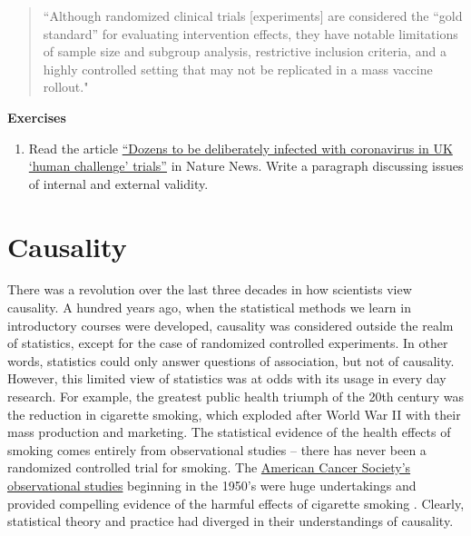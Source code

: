 \documentclass[]{book}
\providecommand{\tightlist}{%
  \setlength{\itemsep}{0pt}\setlength{\parskip}{0pt}}
\begin{document}
\begin{quote}
``Although randomized clinical trials {[}experiments{]} are considered the ``gold standard'' for evaluating intervention effects, they have notable limitations of sample size and subgroup analysis, restrictive inclusion criteria, and a highly controlled setting that may not be replicated in a mass vaccine rollout."
\end{quote}

\textbf{Exercises}

\begin{enumerate}
\def\labelenumi{\arabic{enumi}.}
\tightlist
\item
  Read the article \href{https://www.nature.com/articles/d41586-020-02821-4}{``Dozens to be deliberately infected with coronavirus in UK `human challenge' trials''} in Nature News. Write a paragraph discussing issues of internal and external validity.
\end{enumerate}

\hypertarget{causality}{%
\chapter{Causality}\label{causality}}

There was a revolution over the last three decades in how scientists view causality. A hundred years ago, when the statistical methods we learn in introductory courses were developed, causality was considered outside the realm of statistics, except for the case of randomized controlled experiments. In other words, statistics could only answer questions of association, but not of causality. However, this limited view of statistics was at odds with its usage in every day research. For example, the greatest public health triumph of the 20th century was the reduction in cigarette smoking, which exploded after World War II with their mass production and marketing. The statistical evidence of the health effects of smoking comes entirely from observational studies -- there has never been a randomized controlled trial for smoking. The \href{https://www.cancer.org/latest-news/the-study-that-helped-spur-the-us-stop-smoking-movement.html}{American Cancer Society's observational studies} beginning in the 1950's were huge undertakings and provided compelling evidence of the harmful effects of cigarette smoking \citep{hammond1954relationship, hammond1966smoking}. Clearly, statistical theory and practice had diverged in their understandings of causality.
\end{document}
